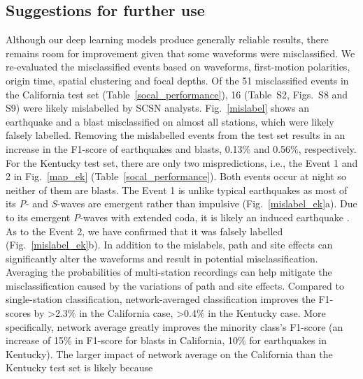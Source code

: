 \documentclass{gji}
\begin{document}
\subsection{Suggestions for further use}
Although our deep learning models produce generally reliable results, there remains room for improvement given that some waveforms were misclassified. We re-evaluated the misclassiﬁed events based on waveforms, first-motion polarities, origin time, spatial clustering and focal depths. Of the 51 misclassiﬁed events in the California test set (Table~\ref{socal_performance}), 16 (Table~S2, Figs.~S8 and S9) were likely mislabelled by SCSN analysts. Fig.~\ref{mislabel} shows an earthquake and a blast misclassified on almost all stations, which were likely falsely labelled. Removing the mislabelled events from the test set results in an increase in the F1-score of earthquakes and blasts, 0.13\% and 0.56\%, respectively. For the Kentucky test set, there are only two mispredictions, i.e., the Event 1 and 2 in Fig.~\ref{map_ek} (Table~\ref{socal_performance}). Both events occur at night so neither of them are blasts. The Event 1 is unlike typical earthquakes as most of its \textit{P}- and \textit{S}-waves are emergent rather than impulsive (Fig.~\ref{mislabel_ek}a). Due to its emergent \textit{P}-waves with extended coda, it is likely an induced earthquake \citep{miao}. As to the Event 2, we have confirmed that it was falsely labelled (Fig.~\ref{mislabel_ek}b). In addition to the mislabels, path and site effects can significantly alter the waveforms and result in potential misclassification. Averaging the probabilities of multi-station recordings can help mitigate the misclassification caused by the variations of path and site effects. Compared to single-station classification, network-averaged classification improves the F1-scores by \textgreater{2.3}\% in the California case, \textgreater{0.4}\% in the Kentucky case. More specifically, network average greatly improves the minority class’s F1-score (an increase of 15\% in F1-score for blasts in California, 10\% for earthquakes in Kentucky). The larger impact of network average on the California than the Kentucky test set is likely because 
\end{document}

